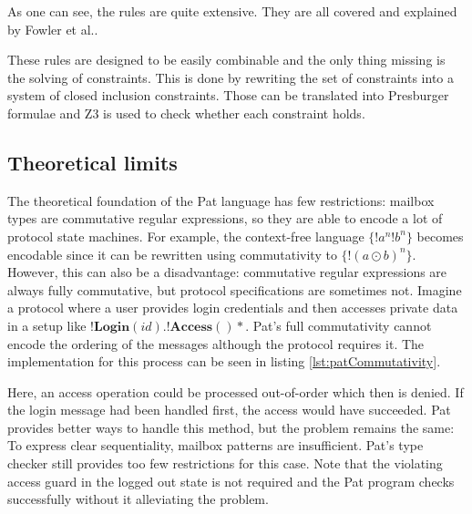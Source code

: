 As one can see, the rules are quite extensive. They are all covered and explained by Fowler et al.\cite{fowlerSpecialDeliveryProgramming2023}.

These rules are designed to be easily combinable and the only thing missing is the solving of constraints. This is done by rewriting the set of constraints into a system of closed inclusion constraints. Those can be translated into Presburger formulae and Z3 is used to check whether each constraint holds.


\subsection{Theoretical limits}

The theoretical foundation of the Pat language has few restrictions: mailbox types are commutative regular expressions, so they are able to encode a lot of protocol state machines. For example, the context-free language $\{ !a^n !b^n \}$ becomes encodable since it can be rewritten using commutativity to $\{ !(a \odot b)^n \}$. However, this can also be a disadvantage: commutative regular expressions are always fully commutative, but protocol specifications are sometimes not. Imagine a protocol where a user provides login credentials and then accesses private data in a setup like $!\textbf{Login}(id).!\textbf{Access}()*$. Pat's full commutativity cannot encode the ordering of the messages although the protocol requires it. The implementation for this process can be seen in listing \ref{lst:patCommutativity}.

Here, an access operation could be processed out-of-order which then is denied. If the login message had been handled first, the access would have succeeded. Pat provides better ways to handle this method, but the problem remains the same: To express clear sequentiality, mailbox patterns are insufficient. Pat's type checker still provides too few restrictions for this case. Note that the violating access guard in the logged out state is not required and the Pat program checks successfully without it alleviating the problem.

